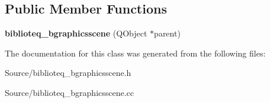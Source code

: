 \subsection*{Public Member Functions}
\begin{DoxyCompactItemize}
\item 
{\bfseries biblioteq\+\_\+bgraphicsscene} (Q\+Object $\ast$parent)\hypertarget{classbiblioteq__bgraphicsscene_a7f6d955afd7852faccb4b7c5e2f1afd2}{}\label{classbiblioteq__bgraphicsscene_a7f6d955afd7852faccb4b7c5e2f1afd2}

\end{DoxyCompactItemize}


The documentation for this class was generated from the following files\+:\begin{DoxyCompactItemize}
\item 
Source/biblioteq\+\_\+bgraphicsscene.\+h\item 
Source/biblioteq\+\_\+bgraphicsscene.\+cc\end{DoxyCompactItemize}
